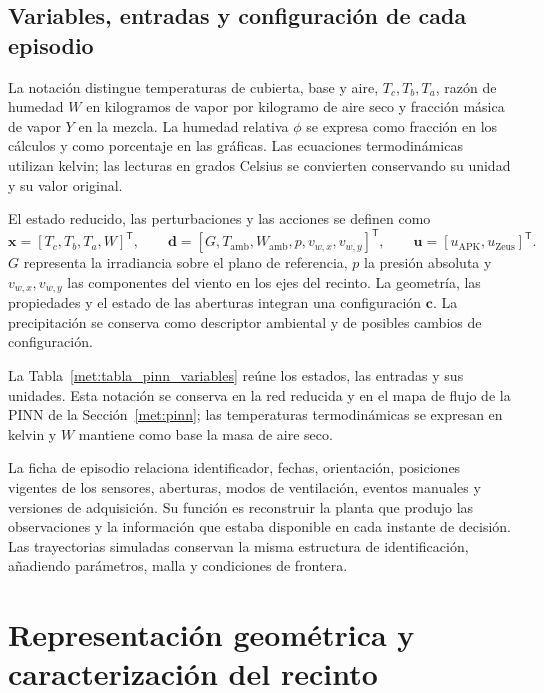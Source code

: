 \subsection{Variables, entradas y configuración de cada episodio}

La notación distingue temperaturas de cubierta, base y aire, $T_c,T_b,T_a$, razón de humedad $W$ en kilogramos de vapor por kilogramo de aire seco y fracción másica de vapor $Y$ en la mezcla. La humedad relativa $\phi$ se expresa como fracción en los cálculos y como porcentaje en las gráficas. Las ecuaciones termodinámicas utilizan kelvin; las lecturas en grados Celsius se convierten conservando su unidad y su valor original.

El estado reducido, las perturbaciones y las acciones se definen como
\begin{equation}
\mathbf x=[T_c,T_b,T_a,W]^{\mathsf T},\qquad
\mathbf d=[G,T_{\mathrm{amb}},W_{\mathrm{amb}},p,v_{w,x},v_{w,y}]^{\mathsf T},
\qquad
\mathbf u=[u_{\mathrm{APK}},u_{\mathrm{Zeus}}]^{\mathsf T}.
\label{met:estados_entradas}
\end{equation}
$G$ representa la irradiancia sobre el plano de referencia, $p$ la presión absoluta y $v_{w,x},v_{w,y}$ las componentes del viento en los ejes del recinto. La geometría, las propiedades y el estado de las aberturas integran una configuración $\mathbf c$. La precipitación se conserva como descriptor ambiental y de posibles cambios de configuración.

La Tabla~\ref{met:tabla_pinn_variables} reúne los estados, las entradas y sus unidades. Esta notación se conserva en la red reducida y en el mapa de flujo de la PINN de la Sección~\ref{met:pinn}; las temperaturas termodinámicas se expresan en kelvin y $W$ mantiene como base la masa de aire seco.



La ficha de episodio relaciona identificador, fechas, orientación, posiciones vigentes de los sensores, aberturas, modos de ventilación, eventos manuales y versiones de adquisición. Su función es reconstruir la planta que produjo las observaciones y la información que estaba disponible en cada instante de decisión. Las trayectorias simuladas conservan la misma estructura de identificación, añadiendo parámetros, malla y condiciones de frontera.

\section{Representación geométrica y caracterización del recinto}
\label{met:caracterizacion}


